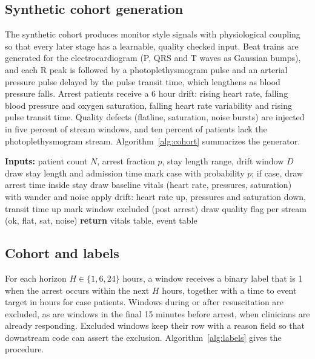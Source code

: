 \documentclass[11pt]{article}
\begin{document}
\subsection{Synthetic cohort generation}
The synthetic cohort produces monitor style signals with physiological coupling so
that every later stage has a learnable, quality checked input. Beat trains are
generated for the electrocardiogram (P, QRS and T waves as Gaussian bumps), and
each R peak is followed by a photoplethysmogram pulse and an arterial pressure
pulse delayed by the pulse transit time, which lengthens as blood pressure falls.
Arrest patients receive a 6 hour drift: rising heart rate, falling blood pressure
and oxygen saturation, falling heart rate variability and rising pulse transit
time. Quality defects (flatline, saturation, noise bursts) are injected in five
percent of stream windows, and ten percent of patients lack the
photoplethysmogram stream. Algorithm~\ref{alg:cohort} summarizes the generator.

\begin{algorithm}[t]
\caption{Synthetic cohort generation}
\label{alg:cohort}
\begin{algorithmic}[1]
\State \textbf{Inputs:} patient count $N$, arrest fraction $p$, stay length range, drift window $D$
    \State draw stay length and admission time
    \State mark case with probability $p$; if case, draw arrest time inside stay
        \State draw baseline vitals (heart rate, pressures, saturation) with wander and noise
            \State apply drift: heart rate up, pressures and saturation down, transit time up
        \EndIf
            \State mark window excluded (post arrest)
        \EndIf
        \State draw quality flag per stream (ok, flat, sat, noise)
    \EndFor
\EndFor
\State \textbf{return} vitals table, event table
\end{algorithmic}
\end{algorithm}

\subsection{Cohort and labels}
For each horizon $H \in \{1, 6, 24\}$ hours, a window receives a binary label that
is 1 when the arrest occurs within the next $H$ hours, together with a time to
event target in hours for case patients. Windows during or after resuscitation are
excluded, as are windows in the final 15 minutes before arrest, when clinicians are
already responding. Excluded windows keep their row with a reason field so that
downstream code can assert the exclusion. Algorithm~\ref{alg:labels} gives the
procedure.
\end{document}
